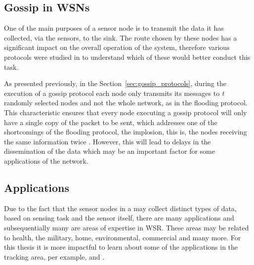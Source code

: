 \subsection{Gossip in WSNs}
\label{subsec:gossip_in_wsns}
One of the main purposes of a sensor node is to transmit the data it has collected, via
the sensors, to the sink. The route chosen by these nodes has a significant impact on the
overall operation of the system, therefore various protocols were studied in \cite{Akkaya2005}
to understand which of these would better conduct this task.

As presented previously, in the Section~\ref{sec:gossip_protocols}, during the execution of a
gossip protocol each node only transmits its messages to \textit{t} randomly selected nodes
and not the whole network, as in the flooding protocol. This characteristic ensures that every
node executing a gossip protocol will only have a single copy of the packet to be sent, which
addresses one of the shortcomings of the flooding protocol, the implosion, this is, the nodes
receiving the same information twice \cite{Akkaya2005}. However, this will lead to delays in
the dissemination of the data which may be an important factor for some applications of the
network.






\subsection{Applications}
\label{subsec:wsn_applications}
Due to the fact that the sensor nodes in a  may collect distinct types of
data, based on sensing task and the sensor itself, there are many applications and
subsequentially many are areas of expertise in WSR. These areas may be related to health, the
military, home, environmental, commercial and many more. For this thesis it is more impactful
to learn about some of the applications in the tracking area, per example, 
and .

